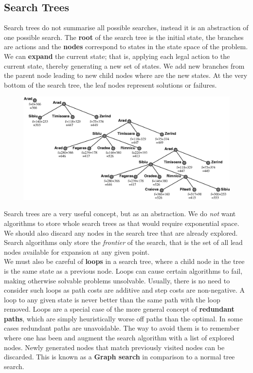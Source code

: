 \documentclass{article}
\newcommand{\n}[0]{\\[\baselineskip]}
\begin{document}
\subsection{Search Trees} 
Search trees do not summarise all possible searches, instead it is an abstraction of one possible search. The \textbf{root} of the search tree is the initial state, the branches are actions and the \textbf{nodes} correspond to states in the state space of the problem. We can \textbf{expand} the current state; that is, applying each legal action to the current state, thereby generating a new set of states. We add new branches from the parent node leading to new child nodes where are the new states. At the very bottom of the search tree, the leaf nodes represent solutions or failures.
\begin{figure}[H]
\centering
\includegraphics[width=1\textwidth, keepaspectratio]{imgs/searchtree.png}
\end{figure}
\noindent
Search trees are a very useful concept, but as an abstraction. We do \textit{not} want algorithms to store whole search trees as that would require exponential space. We should also discard any nodes in the search tree that are already explored. Search algorithms only store the \textit{frontier} of the search, that is the set of all lead nodes available for expansion at any given point.
\n
We must also be careful of \textbf{loops} in a search tree, where a child node in the tree is the same state as a previous node. Loops can cause certain algorithms to fail, making otherwise solvable problems unsolvable. Usually, there is no need to consider such loops as path costs are additive and step costs are non-negative. A loop to any given state is never better than the same path with the loop removed. Loops are a special case of the more general concept of \textbf{redundant paths}, which are simply heuristically worse off paths than the optimal. In some cases redundant paths are unavoidable. The way to avoid them is to remember where one has been and augment the search algorithm with a list of explored nodes. Newly generated nodes that match previously visited nodes can be discarded. This is known as a \textbf{Graph search} in comparison to a normal tree search.
\end{document}
